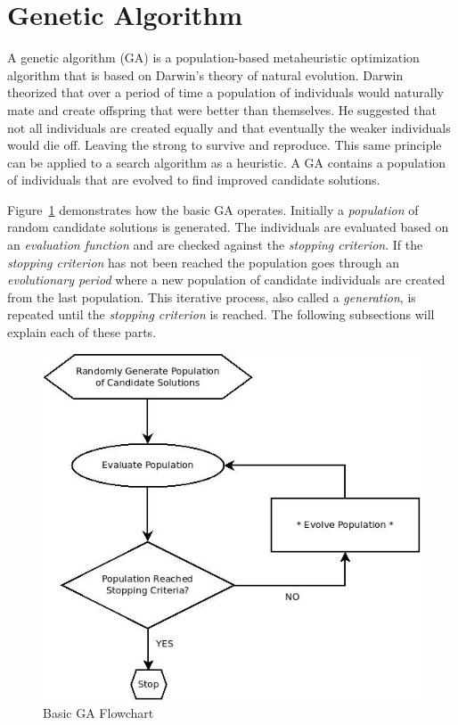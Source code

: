 \section{Genetic Algorithm}
\label{sec:ea}

A genetic algorithm (GA) is a population-based metaheuristic optimization algorithm that is based on Darwin's theory of natural evolution. Darwin theorized that over a period of time a population of individuals would naturally mate and create offspring that were better than themselves. He suggested that not all individuals are created equally and that eventually the weaker individuals would die off. Leaving the strong to survive and reproduce. This same principle can be applied to a search algorithm as a heuristic. A GA contains a population of individuals that are evolved to find improved candidate solutions.

Figure~\ref{fig:evolutionaryFlowchart} demonstrates how the basic GA operates. Initially a \textit{population} of random candidate solutions is generated. The individuals are evaluated based on an \textit{evaluation function} and are checked against the \textit{stopping criterion}. If the \textit{stopping criterion} has not been reached the population goes through an \textit{evolutionary period} where a new population of candidate individuals are created from the last population. This iterative process, also called a \textit{generation}, is repeated until the \textit{stopping criterion} is reached. The following subsections will explain each of these parts.

\begin{figure}[H]
	\centering
	\includegraphics[bb=0 0 524 481,scale=0.5]{figures/EA.jpeg}
	\caption{Basic GA Flowchart}
	\label{fig:evolutionaryFlowchart}
\end{figure}

